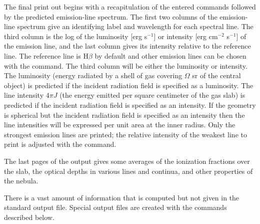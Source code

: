 The final print out begins with a recapitulation of the entered commands
followed by the predicted emission-line spectrum.  The first two columns
of the emission-line spectrum give an identifying label and wavelength for
each spectral line.  The third column is the log of the luminosity [erg
s$^{-1}$] or intensity [erg cm$^{-2}$ s$^{-1}$] of the emission line, and the last column
gives its intensity relative to the reference line.
The reference line is H$\beta$ by default and other emission lines
can be chosen with the  command.
The third column will be either the luminosity or intensity.
The luminosity (energy radiated by a shell of
gas covering $\Omega$ sr of the central object) is predicted if the incident radiation field is
specified as a luminosity.  The line intensity $4\pi J$ (the energy emitted per
square centimeter of the gas slab) is predicted if the incident radiation field is specified
as an intensity.  If the geometry is spherical but the incident radiation field is specified
as an intensity then the line intensities will be expressed per unit area
at the inner radius.  Only the strongest emission lines are printed; the
relative intensity of the weakest line to print is adjusted with the
 command.

The last pages of the output gives some averages of the ionization
fractions over the slab, the optical depths in various lines and continua,
and other properties of the nebula.

There is a vast amount of information that is computed but not given
in the standard output file.  Special output files are created with the
 commands described below.
